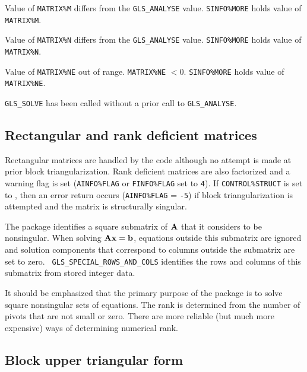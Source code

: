 \documentclass{galahad}
\newcommand{\packagename}{GLS}
\begin{document}
\begin{description}

  Value of {\tt MATRIX\%M} differs from the {\tt \packagename\_ANALYSE} 
value. {\tt SINFO\%MORE} holds value of {\tt MATRIX\%M}.

  Value of {\tt MATRIX\%N} differs from the {\tt \packagename\_ANALYSE} 
value. {\tt SINFO\%MORE} holds value of {\tt MATRIX\%N}.

  Value of {\tt MATRIX\%NE} out of range.  {\tt MATRIX\%NE} $<0$. 
{\tt SINFO\%MORE} holds value of {\tt MATRIX\%NE}.

 {\tt \packagename\_SOLVE} has been called without a prior call to
 {\tt \packagename\_ANALYSE}.

\end{description}

\subsection{Rectangular and rank deficient matrices}

Rectangular matrices are handled by the code although no attempt is made
at prior block triangularization.  Rank deficient matrices are also factorized
and a warning flag is set ({\tt AINFO\%FLAG} or {\tt FINFO\%FLAG} set to 
{\tt 4}).
If {\tt CONTROL\%STRUCT} is set to \true,
then an error return occurs ({\tt AINFO\%FLAG} = {\tt -5}) if block
triangularization is attempted and the matrix is structurally singular.

 The package identifies a square submatrix of ${\mathbf{A}}$ that it considers
to be nonsingular. When solving ${\mathbf{A}} {\mathbf{x}} = {\mathbf{b}}$, equations outside
this submatrix are ignored and solution components that correspond to
columns outside the submatrix are set to zero. {\tt
\packagename\_SPECIAL\_ROWS\_AND\_COLS} identifies the rows and columns
of this submatrix from stored integer data.

It should be emphasized that the primary purpose of the 
package is to solve square nonsingular sets of equations. The
rank is determined from the number of pivots that are not small or zero. 
There are more reliable (but much more expensive) ways of determining 
numerical rank.

\subsection{Block upper triangular form} \label{secbtf}
\end{document}
